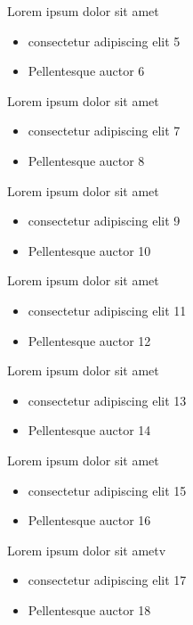 \documentclass{beamer}
\begin{document}
\begin{frame}{Lorem ipsum dolor sit amet}
\begin{itemize}
\item consectetur adipiscing elit 5
\item Pellentesque auctor 6
\end{itemize}
\end{frame}

\begin{frame}{Lorem ipsum dolor sit amet}
\begin{itemize}
\item consectetur adipiscing elit 7
\item Pellentesque auctor 8
\end{itemize}
\end{frame}

\begin{frame}{Lorem ipsum dolor sit amet}
\begin{itemize}
\item consectetur adipiscing elit 9
\item Pellentesque auctor 10
\end{itemize}
\end{frame}

\begin{frame}{Lorem ipsum dolor sit amet}
\begin{itemize}
\item consectetur adipiscing elit 11
\item Pellentesque auctor 12
\end{itemize}
\end{frame}

\begin{frame}{Lorem ipsum dolor sit amet}
\begin{itemize}
\item consectetur adipiscing elit 13
\item Pellentesque auctor 14
\end{itemize}
\end{frame}


\begin{frame}{Lorem ipsum dolor sit amet}
\begin{itemize}
\item consectetur adipiscing elit 15
\item Pellentesque auctor 16
\end{itemize}
\end{frame}


\begin{frame}{Lorem ipsum dolor sit ametv}
\begin{itemize}
\item consectetur adipiscing elit 17
\item Pellentesque auctor 18
\end{itemize}
\end{frame}
\end{document}
